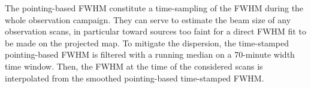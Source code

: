 %
%
The pointing-based FWHM constitute a time-sampling of the FWHM during
the whole observation campaign. They can serve to estimate the beam
size of any observation scans, in particular
toward sources too faint for a direct FWHM fit to be made on the
projected map. To mitigate the dispersion, the time-stamped
pointing-based FWHM is filtered with a running median on a 70-minute
width time window. Then, the FWHM at the time of the considered scans is
interpolated from the smoothed pointing-based time-stamped FWHM.
%
